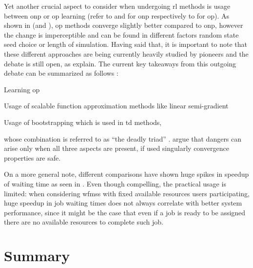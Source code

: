 Yet another crucial aspect to consider when undergoing \gls{rl} methods is usage between \gls{onp} or \gls{op} learning (refer to  and  for \gls{onp} respectively to  for \gls{op}). As shown in  (and ), \gls{op} methods converge slightly better compared to \gls{onp}, however the change is imperceptible and can be found in different factors \eg random state seed choice or length of simulation. Having said that, it is important to note that these different approaches are being currently heavily studied by pioneers and the debate is still open, as \citet[pp. 245--249]{Sutton2017} explain. The current key takeaways from this outgoing debate can be summarized as follows \citep{Sutton2017}:
\begin{enumerate*}
	\item Learning \gls{op}
	\item Usage of scalable function approximation methods like linear semi-gradient 
	\item Usage of bootstrapping which is used in \gls{td} methods,
\end{enumerate*}
whose combination is referred to as ``the deadly triad'' \citep[p. 249]{Sutton2017}. \citet[p. 249]{Sutton2017} argue that dangers can arise only when all three aspects are present, if used singularly convergence properties are safe.

On a more general note, different comparisons have shown huge spikes in speedup of waiting time \eg as seen in . Even though compelling, the practical usage is limited: when considering \glspl{wfms} with fixed available resources \ie users participating, huge speedup in job waiting times does not always correlate with better system performance, since it might be the case that even if a job is ready to be assigned there are no available resources to complete such job.


\section{Summary}
\label{sec:summary}

